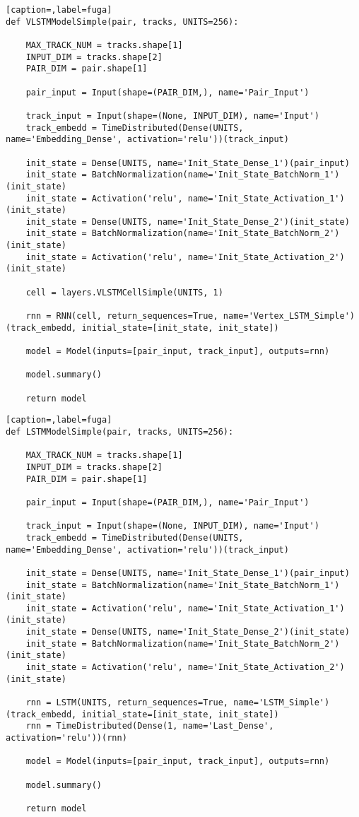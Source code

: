 \begin{lstlisting}[caption=,label=fuga]
def VLSTMModelSimple(pair, tracks, UNITS=256):

    MAX_TRACK_NUM = tracks.shape[1]
    INPUT_DIM = tracks.shape[2]
    PAIR_DIM = pair.shape[1]

    pair_input = Input(shape=(PAIR_DIM,), name='Pair_Input')

    track_input = Input(shape=(None, INPUT_DIM), name='Input')
    track_embedd = TimeDistributed(Dense(UNITS, name='Embedding_Dense', activation='relu'))(track_input)

    init_state = Dense(UNITS, name='Init_State_Dense_1')(pair_input)
    init_state = BatchNormalization(name='Init_State_BatchNorm_1')(init_state)
    init_state = Activation('relu', name='Init_State_Activation_1')(init_state)
    init_state = Dense(UNITS, name='Init_State_Dense_2')(init_state)
    init_state = BatchNormalization(name='Init_State_BatchNorm_2')(init_state)
    init_state = Activation('relu', name='Init_State_Activation_2')(init_state)

    cell = layers.VLSTMCellSimple(UNITS, 1)

    rnn = RNN(cell, return_sequences=True, name='Vertex_LSTM_Simple')(track_embedd, initial_state=[init_state, init_state])
    
    model = Model(inputs=[pair_input, track_input], outputs=rnn)

    model.summary()

    return model
\end{lstlisting}

\begin{lstlisting}[caption=,label=fuga]
def LSTMModelSimple(pair, tracks, UNITS=256):

    MAX_TRACK_NUM = tracks.shape[1]
    INPUT_DIM = tracks.shape[2]
    PAIR_DIM = pair.shape[1]

    pair_input = Input(shape=(PAIR_DIM,), name='Pair_Input')

    track_input = Input(shape=(None, INPUT_DIM), name='Input')
    track_embedd = TimeDistributed(Dense(UNITS, name='Embedding_Dense', activation='relu'))(track_input)

    init_state = Dense(UNITS, name='Init_State_Dense_1')(pair_input)
    init_state = BatchNormalization(name='Init_State_BatchNorm_1')(init_state)
    init_state = Activation('relu', name='Init_State_Activation_1')(init_state)
    init_state = Dense(UNITS, name='Init_State_Dense_2')(init_state)
    init_state = BatchNormalization(name='Init_State_BatchNorm_2')(init_state)
    init_state = Activation('relu', name='Init_State_Activation_2')(init_state)

    rnn = LSTM(UNITS, return_sequences=True, name='LSTM_Simple')(track_embedd, initial_state=[init_state, init_state])
    rnn = TimeDistributed(Dense(1, name='Last_Dense', activation='relu'))(rnn)
    
    model = Model(inputs=[pair_input, track_input], outputs=rnn)

    model.summary()

    return model
\end{lstlisting}

